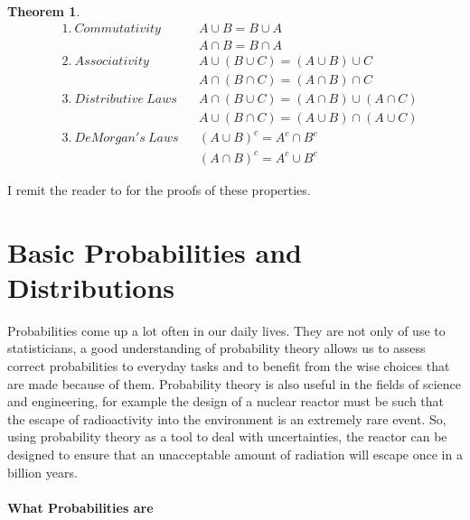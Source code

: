 \documentclass[
  oneside,
  11pt, a4paper,
  footinclude=true,
  headinclude=true,
  cleardoublepage=empty
]{scrbook}
\theoremstyle{definition}
\theoremstyle{definition}
\newtheorem{theorem}{Theorem}[section]
\begin{document}
            \begin{theorem}{}
            \begin{align*}
                &1.\ Commutativity && A \cup B = B \cup A \\
                &                  && A \cap B = B \cap A \\
                &2.\ Associativity && A \cup (B \cup C) = (A \cup B) \cup C \\
                &                  && A \cap (B \cap C) = (A \cap B) \cap C \\
                &3.\ Distributive\ Laws && A \cap (B \cup C) = (A \cap B) \cup (A \cap C) \\
                &                       && A \cup (B \cap C) = (A \cup B) \cap (A \cup C) \\
                &3.\ DeMorgan's\ Laws && (A \cup B)^c = A^c \cap B^c \\
                &                     && (A \cap B)^c = A^c \cup B^c
            \end{align*}{}
            \end{theorem}
            
            I remit the reader to \cite{CaseBerg:01} for the proofs of these properties.
        
        \section{Basic Probabilities and Distributions}
        
            Probabilities come up a lot often in our daily lives. They are not only of use to statisticians, a good understanding of probability theory allows us to assess correct probabilities to everyday tasks and to benefit from the wise choices that are made because of them. Probability theory is also useful in the fields of science and engineering, for example the design of a nuclear reactor must be such that the escape of radioactivity into the environment is an extremely rare event. So, using probability theory as a tool to deal with uncertainties, the reactor can be designed to ensure that an unacceptable amount of radiation will escape once in a billion years.
            
	        \paragraph{What Probabilities are}
            
\end{document}
